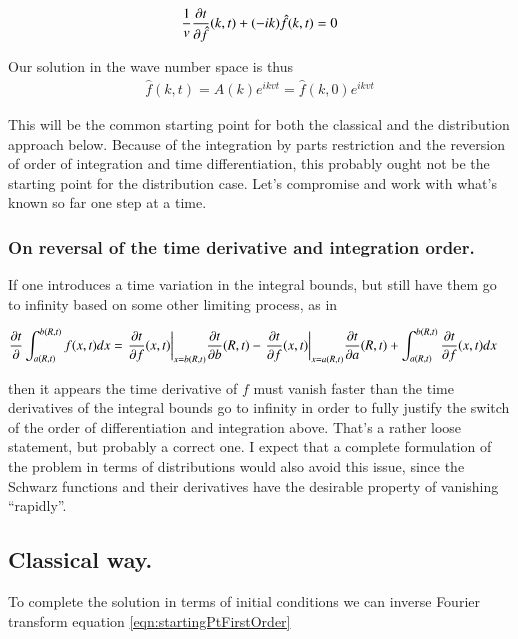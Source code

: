 \documentclass{article}
\begin{document}
\begin{align}
\frac{1}{v} \frac{\partial{t}}{\partial {\hat{f}}}(k,t) + (-ik)\hat{f}(k,t) = 0
\end{align}

Our solution in the wave number space is thus
\begin{align}\label{eqn:startingPtFirstOrder}
{\hat{f}}(k,t) = A(k) e^{i k v t} = \hat{f}(k,0) e^{i k v t}
\end{align}

This will be the common starting point for both the classical and the distribution approach below.
Because of the integration by parts restriction and the reversion of order of integration and time differentiation, this probably ought not
be the starting point for the distribution case.  Let's compromise and work with what's known so far one step at a time.

\subsubsection{ On reversal of the time derivative and integration order. }

If one introduces a time variation
in the integral bounds, but still have them go to infinity based on some
other limiting process, as in

\begin{align*}
\frac{\partial{t}}{\partial {}} \int_{a(R,t)}^{b(R,t)} f(x,t) dx
&=
{\left.\frac{\partial{t}}{\partial {f}}(x,t)\right\vert}_{x = b(R,t)} \frac{\partial{t}}{\partial {b}}(R,t)
-{\left.\frac{\partial{t}}{\partial {f}}(x,t)\right\vert}_{x = a(R,t)} \frac{\partial{t}}{\partial {a}}(R,t)
+ \int_{a(R,t)}^{b(R,t)} \frac{\partial{t}}{\partial {f}}(x,t) dx
\end{align*}

then
it appears the time derivative of $f$ must vanish faster than the time derivatives of the 
integral bounds go to infinity in order to fully justify the switch of 
the order of differentiation and integration above.  That's a rather loose statement, but probably a correct one.  I expect that
a complete formulation of the problem in terms of distributions would also avoid this issue, since the Schwarz functions and their 
derivatives have the desirable property of vanishing ``rapidly''.

\subsection{ Classical way. }

To complete the solution in terms of initial conditions we can inverse Fourier transform
equation \ref{eqn:startingPtFirstOrder}
\end{document}
